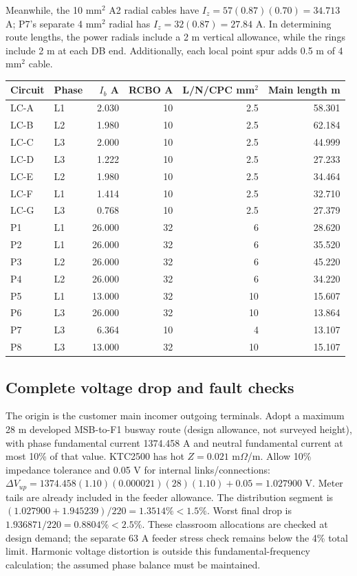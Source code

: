 Meanwhile, the 10 mm$^2$ A2 radial cables have $I_z=57(0.87)(0.70)=34.713$ A;  P7's separate 4 mm$^2$ radial has $I_z=32(0.87)=27.84$ A. In determining route lengths, the power radials include a 2 m vertical allowance, while the rings include 2 m at each DB end. Additionally, each local point spur adds 0.5 m of 4 mm$^2$ cable.
\begingroup\small\renewcommand{\arraystretch}{1.0}
\begin{longtable}{llrrrr}\toprule
Circuit & Phase & $I_b$ A & RCBO A & L/N/CPC mm$^2$ & Main length m\\\midrule\endhead

LC-A & L1 & 2.030 & 10 & 2.5 & 58.301 \\
LC-B & L2 & 1.980 & 10 & 2.5 & 62.184 \\
LC-C & L3 & 2.000 & 10 & 2.5 & 44.999 \\
LC-D & L3 & 1.222 & 10 & 2.5 & 27.233 \\
LC-E & L2 & 1.980 & 10 & 2.5 & 34.464 \\
LC-F & L1 & 1.414 & 10 & 2.5 & 32.710 \\
LC-G & L3 & 0.768 & 10 & 2.5 & 27.379 \\
P1 & L1 & 26.000 & 32 & 6 & 28.620 \\
P2 & L1 & 26.000 & 32 & 6 & 35.520 \\
P3 & L2 & 26.000 & 32 & 6 & 45.220 \\
P4 & L2 & 26.000 & 32 & 6 & 34.220 \\
P5 & L1 & 13.000 & 32 & 10 & 15.607 \\
P6 & L3 & 26.000 & 32 & 10 & 13.864 \\
P7 & L3 & 6.364 & 10 & 4 & 13.107 \\
P8 & L3 & 13.000 & 32 & 10 & 15.107 \\

\bottomrule\end{longtable}
\endgroup
\subsection*{Complete voltage drop and fault checks}
The origin is the customer main incomer outgoing terminals. Adopt a maximum 28 m developed MSB-to-F1 busway route (design allowance, not surveyed height), with phase fundamental current 1374.458 A and neutral fundamental current at most 10\% of that value. KTC2500 has hot $Z=0.021$ m$\Omega$/m. Allow 10\% impedance tolerance and 0.05 V for internal links/connections: $\Delta V_{up}=1374.458(1.10)(0.000021)(28)(1.10)+0.05=1.027900$ V. Meter tails are already included in the feeder allowance. The distribution segment is $(1.027900+1.945239)/220=1.3514\%<1.5\%$. Worst final drop is $1.936871/220=0.8804\%<2.5\%$. These classroom allocations are checked at design demand; the separate 63 A feeder stress check remains below the 4\% total limit. Harmonic voltage distortion is outside this fundamental-frequency calculation; the assumed phase balance must be maintained.

